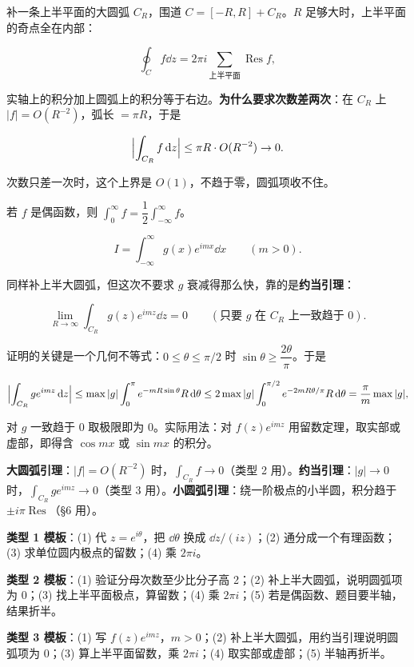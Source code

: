 \documentclass[11pt]{ctexart}
\let\origsubhdr\subhdr
\renewcommand{\subhdr}[1]{\par\needspace{4\baselineskip}\origsubhdr{#1}}
\begin{document}
补一条上半平面的大圆弧 $C_R$，围道 $C=[-R,R]+C_R$。$R$ 足够大时，上半平面的奇点全在内部：

\[ \oint_C f\dd z=2\pi i\sum_{\text{上半平面}}\operatorname{Res}f , \]

实轴上的积分加上圆弧上的积分等于右边。\textbf{为什么要求次数差两次}：在 $C_R$ 上 $|f|=O(R^{-2})$，弧长 $=\pi R$，于是

\[ \Bigl|\int_{C_R}f\,\mathrm{d} z\Bigr|\le \pi R\cdot O(R^{-2})\to0 . \]

次数只差一次时，这个上界是 $O(1)$，不趋于零，圆弧项收不住。

若 $f$ 是偶函数，则 $\int_0^{\infty}f=\dfrac12\int_{-\infty}^{\infty}f$。


\[ I=\int_{-\infty}^{\infty}g(x)e^{imx}\dd x\qquad(m>0) . \]

同样补上半大圆弧，但这次不要求 $g$ 衰减得那么快，靠的是\textbf{约当引理}：

\[ \lim_{R\to\infty}\int_{C_R}g(z)e^{imz}\dd z=0\qquad(\text{只要 }g\text{ 在 }C_R\text{ 上一致趋于 }0) . \]

证明的关键是一个几何不等式：$0\le\theta\le\pi/2$ 时 $\sin\theta\ge\dfrac{2\theta}{\pi}$。于是

\[ \Bigl|\int_{C_R}g e^{imz}\,\mathrm{d} z\Bigr|\le \max|g|\int_0^{\pi}e^{-mR\sin\theta}R\,\mathrm{d}\theta\le 2\max|g|\int_0^{\pi/2}e^{-2mR\theta/\pi}R\,\mathrm{d}\theta=\frac{\pi}{m}\max|g| , \]

对 $g$ 一致趋于 0 取极限即为 0。实际用法：对 $f(z)e^{imz}$ 用留数定理，取实部或虚部，即得含 $\cos mx$ 或 $\sin mx$ 的积分。


\textbf{大圆弧引理}：$|f|=O(R^{-2})$ 时，$\int_{C_R}f\to0$（类型 2 用）。\textbf{约当引理}：$|g|\to0$ 时，$\int_{C_R}ge^{imz}\to0$（类型 3 用）。\textbf{小圆弧引理}：绕一阶极点的小半圆，积分趋于 $\pm i\pi\operatorname{Res}$（§6 用）。


\textbf{类型 1 模板}：(1) 代 $z=e^{i\theta}$，把 $\dd\theta$ 换成 $\dd z/(iz)$；(2) 通分成一个有理函数；(3) 求单位圆内极点的留数；(4) 乘 $2\pi i$。

\textbf{类型 2 模板}：(1) 验证分母次数至少比分子高 2；(2) 补上半大圆弧，说明圆弧项为 0；(3) 找上半平面极点，算留数；(4) 乘 $2\pi i$；(5) 若是偶函数、题目要半轴，结果折半。

\textbf{类型 3 模板}：(1) 写 $f(z)e^{imz}$，$m>0$；(2) 补上半大圆弧，用约当引理说明圆弧项为 0；(3) 算上半平面留数，乘 $2\pi i$；(4) 取实部或虚部；(5) 半轴再折半。
\end{document}
